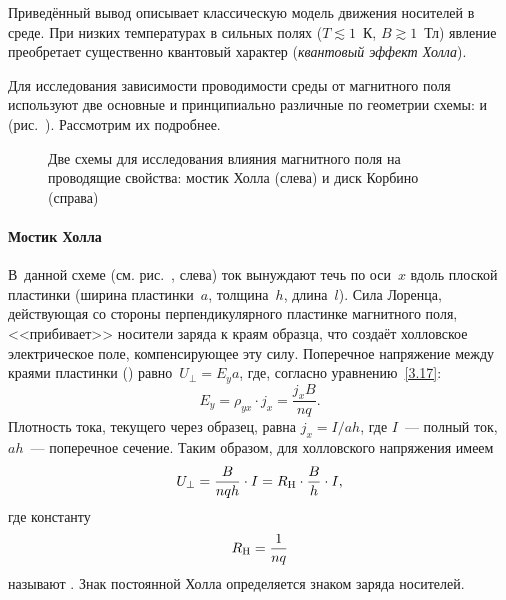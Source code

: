 \begin{lab:note}
Приведённый вывод описывает классическую модель движения носителей
в среде. При низких температурах  в сильных полях ($T\lesssim 1$~К, $B\gtrsim1$~Тл)
явление преобретает существенно квантовый характер
(\emph{квантовый эффект Холла}). 
\end{lab:note}



Для исследования зависимости проводимости среды от магнитного поля 
используют две основные и принципиально различные по геометрии схемы: 
 и  (рис.~).
Рассмотрим их подробнее.

\begin{figure}[h!]
\centering
    \caption{Две схемы для исследования влияния магнитного поля на
проводящие свойства: мостик Холла (слева) и диск Корбино (справа)}
\end{figure}

\paragraph{Мостик Холла}
В~данной схеме (см. рис.~, слева) ток вынуждают течь по
оси~$x$ вдоль плоской пластинки (ширина пластинки~$a$, толщина~$h$,
длина~$l$).
Сила Лоренца, действующая со стороны перпендикулярного
пластинке магнитного поля, <<прибивает>> носители заряда к краям образца,
что создаёт холловское электрическое поле, компенсирующее эту силу.
Поперечное напряжение между краями пластинки
() равно~$U_{\perp}=E_ya$,
где, согласно уравнению~\eqref{3.17}:
\[
E_y=\rho_{yx}\cdot j_x=\frac{j_x B}{nq}.
\]
Плотность тока, текущего через образец, равна $j_x=I/ah$, где $I$~---
полный ток, $ah$~--- поперечное сечение.
Таким образом, для холловского напряжения имеем
\begin{equation}
    U_{\perp}=\frac{B}{nqh}\cdot I =R_{\rm H}\cdot \frac{B}{h}\cdot I,
    \eqmark{3.19}
\end{equation}
где константу
\begin{equation}
    R_{\rm H}= \frac{1}{nq}
    \eqmark{HallConstant}
\end{equation}
называют . 
Знак постоянной Холла определяется знаком заряда носителей.

